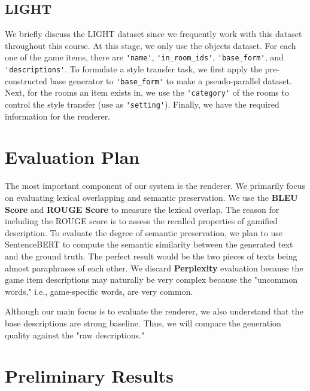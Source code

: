 \documentclass[12pt]{article}
\begin{document}
  \subsection{LIGHT} We briefly discuss the LIGHT dataset since we frequently work with this dataset throughout
    this course. At this stage, we only use the objects dataset. For each one of the game items, there are 
    \lstinline{'name'}, \lstinline{'in_room_ids'}, \lstinline{'base_form'}, and \lstinline{'descriptions'}. 
    To formulate a style transfer task, we first apply 
    the pre-constructed base generator to \lstinline{'base_form'} to make a pseudo-parallel dataset. 
    Next, for the rooms an item exists in, we use the \lstinline{'category'} of the rooms to control the 
    style transfer (use as \lstinline{'setting'}). Finally, we have the required information for the renderer.

\section{Evaluation Plan}
The most important component of our system is the renderer. We primarily focus on evaluating lexical overlapping and 
  semantic preservation. We use the \textbf{BLEU Score} and \textbf{ROUGE Score} 
  to measure the lexical overlap. The reason for including the ROUGE score is to assess the recalled properties of 
  gamified description. To evaluate the degree of semantic preservation, we plan to use SentenceBERT to compute the 
  semantic similarity between the generated text and the ground truth. The perfect result would be the two pieces of 
  texts being almost paraphrases of each other. We discard \textbf{Perplexity} evaluation because the game item descriptions may naturally be very complex 
  because the "uncommon words," i.e., game-specific words, are very common. 

Although our main focus is to evaluate the renderer, we also understand that the base descriptions are 
  strong baseline. Thus, we will compare the generation quality against the "raw descriptions."

\section{Preliminary Results}
\label{section:pre_results}
\end{document}
